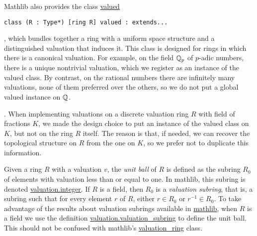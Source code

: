 \documentclass[sigplan,10pt,anonymous,review]{acmart}
\begin{document}
Mathlib also provides the class \href{https://leanprover-community.github.io/mathlib_docs/topology/algebra/valuation.html#valued}{valued}
\begin{lstlisting}
class (R : Type*) [ring R] valued : extends...
\end{lstlisting}
, which bundles together a ring with a
uniform space structure and a distinguished valuation that induces it. This class is designed for rings in which there is a canonical valuation. For example, on the field $\mathbb{Q}_p$ of $p$-adic numbers, there is a unique nontrivial valuation, which we register as an instance of the valued class. By contrast, on the rational numbers there are infinitely many valuations, none of them preferred over the others, so we do not put a global valued instance on $\mathbb{Q}$.

. When implementing valuations on a discrete valuation ring $R$ with field of fractions $K$, we made the design choice to put an instance of the valued class on $K$, but not on the ring $R$ itself. The reason is that, if needed, we can recover the
topological structure on $R$ from the one on $K$, so we prefer not to duplicate this information. 

Given a ring $R$ with a valuation $v$, the \textit{unit ball}  of $R$ is defined as the subring $R_0$ of elements with valuation less than or equal to one. In mathlib, this subring is denoted \href{https://leanprover-community.github.io/mathlib_docs/ring_theory/valuation/integers.html#valuation.integer}{valuation.integer}. If $R$ is a field, then $R_0$ is a \textit{valuation subring}, that is, a subring such that for every element $r$ of $R$, either $r \in R_0$ or $r^{-1} \in R_0$.
To take advantage of the results about valuation subrings available in \href{https://leanprover-community.github.io/mathlib_docs/ring_theory/valuation/valuation_subring.html#valuation_subring}{mathlib}, when $R$ is a field we use the definition \href{https://leanprover-community.github.io/mathlib_docs/ring_theory/valuation/valuation_subring.html#valuation.valuation_subring}{valuation.valuation\_subring} to define the unit ball. This should not be confused with mathlib's \href{https://leanprover-community.github.io/mathlib_docs/ring_theory/valuation/valuation_ring.html#valuation_ring}{valuation\_ring} class.
 
\end{document}
